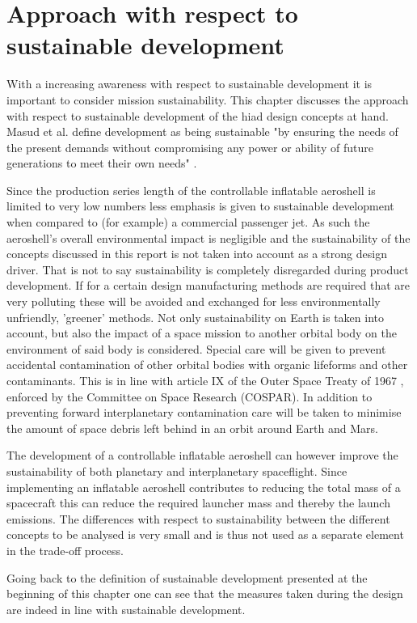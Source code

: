\section{Approach with respect to sustainable development}
\label{ch:sustain}

With a increasing awareness with respect to sustainable development it is important to consider mission sustainability. This chapter discusses the approach with respect to sustainable development of the \gls{hiad} design concepts at hand. Masud et al. define development as being sustainable "by ensuring the needs of the present demands without compromising any power or ability of future generations to meet their own needs" \cite[p.85]{Masud2011}.

Since the production series length of the controllable inflatable aeroshell is limited to very low numbers less emphasis is given to sustainable development when compared to (for example) a commercial passenger jet. As such the aeroshell's overall environmental impact is negligible and the sustainability of the concepts discussed in this report is not taken into account as a strong design driver. That is not to say sustainability is completely disregarded during product development. If for a certain design manufacturing methods are required that are very polluting these will be avoided and exchanged for less environmentally unfriendly, 'greener' methods. 
Not only sustainability on Earth is taken into account, but also the impact of a space mission to another orbital body on the environment of said body is considered. Special care will be given to prevent accidental contamination of other orbital bodies with organic lifeforms and other contaminants. This is in line with article IX of the Outer Space Treaty of 1967 \cite{UnitedNations2008}, enforced by the Committee on Space Research (COSPAR). In addition to preventing forward interplanetary contamination care will be taken to minimise the amount of space debris left behind in an orbit around Earth and Mars. 

The development of a controllable inflatable aeroshell can however improve the sustainability of both planetary and interplanetary spaceflight. Since implementing an inflatable aeroshell contributes to reducing the total mass of a spacecraft this can reduce the required launcher mass and thereby the launch emissions. The differences with respect to sustainability between the different concepts to be analysed is very small and is thus not used as a separate element in the trade-off process.

Going back to the definition of sustainable development presented at the beginning of this chapter one can see that the measures taken during the design are indeed in line with sustainable development.